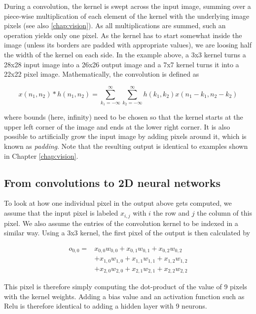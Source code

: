 During a convolution, the kernel is swept across the input image, summing over a piece-wise multiplication of each element of the kernel with the underlying image pixels (see also \cref{chap:vision}). As all multiplications are summed, such an operation yields only one pixel. As the kernel has to start somewhat inside the image (unless its borders are padded with appropriate values), we are loosing half the width of the kernel on each side. In the example above, a 3x3 kernel turns a 28x28 input image into a 26x26 output image and a 7x7 kernel turns it into a 22x22 pixel image. Mathematically, the convolution is defined as

\begin{equation}
x(n_1,n_2)*h(n_1,n_2)=\sum_{k_1=-\infty}^{\infty} \sum_{k_2=-\infty}^{\infty} h(k_1,k_2)x(n_1-k_1,n_2-k_2)
\end{equation}

where bounds (here, infinity) need to be chosen so that the kernel starts at the upper left corner of the image and ends at the lower right corner. It is also possible to artificially grow the input image by adding pixels around it, which is known as \textsl{padding}. Note that the resulting output is identical to examples shown in Chapter \ref{chap:vision}.

\subsection{From convolutions to 2D neural networks}

To look at how one individual pixel in the output above gets computed, we assume that the input pixel is labeled $x_{i,j}$ with $i$ the row and $j$ the column of this pixel. We also assume the entries of the convolution kernel to be indexed in a similar way. Using a 3x3 kernel, the first pixel of the output is then calculated by

\begin{eqnarray}
o_{0,0}=&x_{0,0}w_{0,0}+x_{0,1}w_{0,1}+x_{0,2}w_{0,2}\\
\nonumber
		&+x_{1,0}w_{1,0}+x_{1,1}w_{1,1}+x_{1,2}w_{1,2}\\
\nonumber
		&+x_{2,0}w_{2,0}+x_{2,1}w_{2,1}+x_{2,2}w_{2,2}
\end{eqnarray}

This pixel is therefore simply computing the dot-product of the value of 9 pixels with the kernel weights. Adding a bias value and an activation function such as Relu is therefore identical to adding a hidden layer with 9 neurons. 

